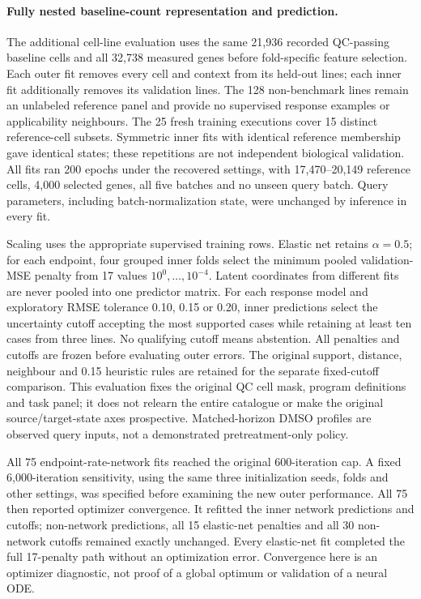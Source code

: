 \documentclass[a4paper,fleqn]{cas-sc}
\begin{document}
\clearpage
\paragraph{Fully nested baseline-count representation and prediction.}
The additional cell-line evaluation uses the same 21,936 recorded QC-passing baseline cells and all 32,738 measured genes before fold-specific feature selection. Each outer fit removes every cell and context from its held-out lines; each inner fit additionally removes its validation lines. The 128 non-benchmark lines remain an unlabeled reference panel and provide no supervised response examples or applicability neighbours. The 25 fresh training executions cover 15 distinct reference-cell subsets. Symmetric inner fits with identical reference membership gave identical states; these repetitions are not independent biological validation. All fits ran 200 epochs under the recovered settings, with 17,470--20,149 reference cells, 4,000 selected genes, all five batches and no unseen query batch. Query parameters, including batch-normalization state, were unchanged by inference in every fit.

Scaling uses the appropriate supervised training rows. Elastic net retains $\alpha=0.5$; for each endpoint, four grouped inner folds select the minimum pooled validation-MSE penalty from 17 values $10^0,\ldots,10^{-4}$. Latent coordinates from different fits are never pooled into one predictor matrix. For each response model and exploratory RMSE tolerance 0.10, 0.15 or 0.20, inner predictions select the uncertainty cutoff accepting the most supported cases while retaining at least ten cases from three lines. No qualifying cutoff means abstention. All penalties and cutoffs are frozen before evaluating outer errors. The original support, distance, neighbour and 0.15 heuristic rules are retained for the separate fixed-cutoff comparison. This evaluation fixes the original QC cell mask, program definitions and task panel; it does not relearn the entire catalogue or make the original source/target-state axes prospective. Matched-horizon DMSO profiles are observed query inputs, not a demonstrated pretreatment-only policy.

All 75 endpoint-rate-network fits reached the original 600-iteration cap. A fixed 6,000-iteration sensitivity, using the same three initialization seeds, folds and other settings, was specified before examining the new outer performance. All 75 then reported optimizer convergence. It refitted the inner network predictions and cutoffs; non-network predictions, all 15 elastic-net penalties and all 30 non-network cutoffs remained exactly unchanged. Every elastic-net fit completed the full 17-penalty path without an optimization error. Convergence here is an optimizer diagnostic, not proof of a global optimum or validation of a neural ODE.
\end{document}
